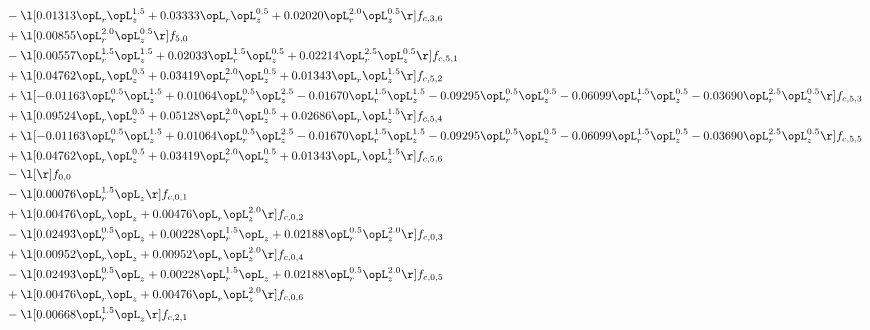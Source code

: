 \begin{alignat}{2}
& - \l[  0.01313 \opL_r \opL_z^{1.5} +  0.03333 \opL_r \opL_z^{0.5} +  0.02020 \opL_r^{2.0} \opL_z^{0.5}  \r] f_{c,3,6} \nonumber \\ 
& + \l[  0.00855 \opL_r^{2.0} \opL_z^{0.5}  \r] f_{5,0} \nonumber \\ 
& - \l[  0.00557 \opL_r^{1.5} \opL_z^{1.5} +  0.02033 \opL_r^{1.5} \opL_z^{0.5} +  0.02214 \opL_r^{2.5} \opL_z^{0.5}  \r] f_{c,5,1} \nonumber \\ 
& + \l[  0.04762 \opL_r \opL_z^{0.5} +  0.03419 \opL_r^{2.0} \opL_z^{0.5} +  0.01343 \opL_r \opL_z^{1.5}  \r] f_{c,5,2} \nonumber \\ 
& + \l[  -0.01163 \opL_r^{0.5} \opL_z^{1.5} +  0.01064 \opL_r^{0.5} \opL_z^{2.5}   -0.01670 \opL_r^{1.5} \opL_z^{1.5}   -0.09295 \opL_r^{0.5} \opL_z^{0.5}   -0.06099 \opL_r^{1.5} \opL_z^{0.5}   -0.03690 \opL_r^{2.5} \opL_z^{0.5}  \r] f_{c,5,3} \nonumber \\ 
& + \l[  0.09524 \opL_r \opL_z^{0.5} +  0.05128 \opL_r^{2.0} \opL_z^{0.5} +  0.02686 \opL_r \opL_z^{1.5}  \r] f_{c,5,4} \nonumber \\ 
& + \l[  -0.01163 \opL_r^{0.5} \opL_z^{1.5} +  0.01064 \opL_r^{0.5} \opL_z^{2.5}   -0.01670 \opL_r^{1.5} \opL_z^{1.5}   -0.09295 \opL_r^{0.5} \opL_z^{0.5}   -0.06099 \opL_r^{1.5} \opL_z^{0.5}   -0.03690 \opL_r^{2.5} \opL_z^{0.5}  \r] f_{c,5,5} \nonumber \\ 
& + \l[  0.04762 \opL_r \opL_z^{0.5} +  0.03419 \opL_r^{2.0} \opL_z^{0.5} +  0.01343 \opL_r \opL_z^{1.5}  \r] f_{c,5,6} \nonumber \\ 
& - \l[  \r] f_{0,0} \nonumber \\ 
& - \l[  0.00076 \opL_r^{1.5} \opL_z  \r] f_{c,0,1} \nonumber \\ 
& + \l[  0.00476 \opL_r \opL_z +  0.00476 \opL_r \opL_z^{2.0}  \r] f_{c,0,2} \nonumber \\ 
& - \l[  0.02493 \opL_r^{0.5} \opL_z +  0.00228 \opL_r^{1.5} \opL_z +  0.02188 \opL_r^{0.5} \opL_z^{2.0}  \r] f_{c,0,3} \nonumber \\ 
& + \l[  0.00952 \opL_r \opL_z +  0.00952 \opL_r \opL_z^{2.0}  \r] f_{c,0,4} \nonumber \\ 
& - \l[  0.02493 \opL_r^{0.5} \opL_z +  0.00228 \opL_r^{1.5} \opL_z +  0.02188 \opL_r^{0.5} \opL_z^{2.0}  \r] f_{c,0,5} \nonumber \\ 
& + \l[  0.00476 \opL_r \opL_z +  0.00476 \opL_r \opL_z^{2.0}  \r] f_{c,0,6} \nonumber \\ 
& - \l[  0.00668 \opL_r^{1.5} \opL_z  \r] f_{c,2,1} \nonumber \\ 

\end{alignat}
